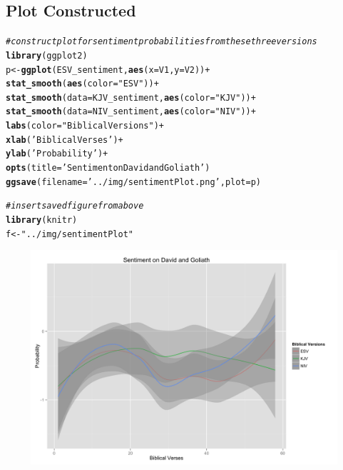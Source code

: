 \documentclass{article}\usepackage[]{graphicx}\usepackage[]{color}
\makeatletter
\newcommand{\hlstr}[1]{\textcolor[rgb]{0.192,0.494,0.8}{#1}}%
\newcommand{\hlcom}[1]{\textcolor[rgb]{0.678,0.584,0.686}{\textit{#1}}}%
\newcommand{\hlopt}[1]{\textcolor[rgb]{0,0,0}{#1}}%
\newcommand{\hlstd}[1]{\textcolor[rgb]{0.345,0.345,0.345}{#1}}%
\newcommand{\hlkwb}[1]{\textcolor[rgb]{0.69,0.353,0.396}{#1}}%
\newcommand{\hlkwc}[1]{\textcolor[rgb]{0.333,0.667,0.333}{#1}}%
\newcommand{\hlkwd}[1]{\textcolor[rgb]{0.737,0.353,0.396}{\textbf{#1}}}%
\newenvironment{kframe}{%
 \def\at@end@of@kframe{}%
 \ifinner\ifhmode%
  \def\at@end@of@kframe{\end{minipage}}%
  \begin{minipage}{\columnwidth}%
 \fi\fi%
 \def\FrameCommand##1{\hskip\@totalleftmargin \hskip-\fboxsep
 \colorbox{shadecolor}{##1}\hskip-\fboxsep
     \hskip-\linewidth \hskip-\@totalleftmargin \hskip\columnwidth}%
 \MakeFramed {\advance\hsize-\width
   \@totalleftmargin\z@ \linewidth\hsize
   \@setminipage}}%
 {\par\unskip\endMakeFramed%
 \at@end@of@kframe}
\newenvironment{knitrout}{}{} %
\makeatother
\begin{document}
\subsection{Plot Constructed}
\begin{kframe}
\begin{alltt}
\hlcom{# construct plot for sentiment probabilities from these three versions}
\hlkwd{library}\hlstd{(ggplot2)}
\hlstd{p} \hlkwb{<-} \hlkwd{ggplot}\hlstd{(ESV_sentiment,} \hlkwd{aes}\hlstd{(}\hlkwc{x}\hlstd{=V1,} \hlkwc{y}\hlstd{=V2))}\hlopt{+}
     \hlkwd{stat_smooth}\hlstd{(}\hlkwd{aes}\hlstd{(}\hlkwc{color}\hlstd{=}\hlstr{"ESV"}\hlstd{))}\hlopt{+}
     \hlkwd{stat_smooth}\hlstd{(}\hlkwc{data}\hlstd{=KJV_sentiment,} \hlkwd{aes}\hlstd{(}\hlkwc{color}\hlstd{=}\hlstr{"KJV"}\hlstd{))}\hlopt{+}
     \hlkwd{stat_smooth}\hlstd{(}\hlkwc{data}\hlstd{=NIV_sentiment,} \hlkwd{aes}\hlstd{(}\hlkwc{color}\hlstd{=}\hlstr{"NIV"}\hlstd{))}\hlopt{+}
     \hlkwd{labs}\hlstd{(}\hlkwc{color}\hlstd{=}\hlstr{"Biblical Versions"}\hlstd{)} \hlopt{+}
     \hlkwd{xlab}\hlstd{(}\hlstr{'Biblical Verses'}\hlstd{)} \hlopt{+}
     \hlkwd{ylab}\hlstd{(}\hlstr{'Probability'}\hlstd{)} \hlopt{+}
     \hlkwd{opts}\hlstd{(}\hlkwc{title}\hlstd{=}\hlstr{'Sentiment on David and Goliath'}\hlstd{)}
\hlkwd{ggsave}\hlstd{(}\hlkwc{filename}\hlstd{=}\hlstr{'../img/sentimentPlot.png'}\hlstd{,} \hlkwc{plot} \hlstd{= p)}
\end{alltt}
\end{kframe}


\begin{knitrout}
\color{fgcolor}\begin{kframe}
\begin{alltt}
\hlcom{# insert saved figure from above}
\hlkwd{library}\hlstd{(knitr)}
\hlstd{f} \hlkwb{<-} \hlstr{"../img/sentimentPlot"}
\end{alltt}
\end{kframe}
\end{knitrout}

\includegraphics[width=500px,height=300px]{../img/sentimentPlot}
\end{document}
